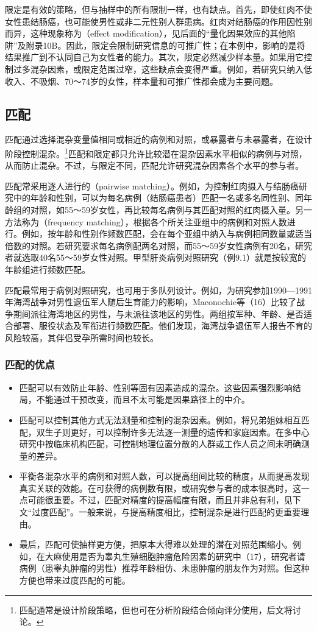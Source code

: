 限定是有效的策略，但与抽样中的所有限制一样，也有缺点。首先，即使红肉不使女性患结肠癌，也可能使男性或非二元性别人群患病。红肉对结肠癌的作用因性别而异，这种现象称为（effect modification），见后面的“量化因果效应的其他陷阱”及附录10B。因此，限定会限制研究信息的可推广性；在本例中，影响的是将结果推广到不认同自己为女性者的能力。其次，限定必然减少样本量。如果用它控制过多混杂因素，或限定范围过窄，这些缺点会变得严重。例如，若研究只纳入低收入、不吸烟、70～74岁的女性，样本量和可推广性都会成为主要问题。

\subsection{匹配}
匹配通过选择混杂变量值相同或相近的病例和对照，或暴露者与未暴露者，在设计阶段控制混杂。\footnote{匹配通常是设计阶段策略，但也可在分析阶段结合倾向评分使用，后文将讨论。}匹配和限定都只允许比较潜在混杂因素水平相似的病例与对照，从而防止混杂。不过，与限定不同，匹配允许研究混杂因素各个水平的参与者。

匹配常采用逐人进行的（pairwise matching）。例如，为控制红肉摄入与结肠癌研究中的年龄和性别，可以为每名病例（结肠癌患者）匹配一名或多名同性别、同年龄组的对照，如55～59岁女性，再比较每名病例与其匹配对照的红肉摄入量。另一方法称为（frequency matching），根据各个所关注亚组中的病例和对照人数进行。例如，按年龄和性别作频数匹配，会在每个亚组中纳入与病例相同数量或适当倍数的对照。若研究要求每名病例配两名对照，而55～59岁女性病例有20名，研究者就选取40名55～59岁女性对照。甲型肝炎病例对照研究（例9.1）就是按较宽的年龄组进行频数匹配。

匹配最常用于病例对照研究，也可用于多队列设计。例如，为研究参加1990—1991年海湾战争对男性退伍军人随后生育能力的影响，Maconochie等（16）比较了战争期间派往海湾地区的男性，与未派往该地区的男性。两组按军种、年龄、是否适合部署、服役状态及军衔进行频数匹配。他们发现，海湾战争退伍军人报告不育的风险较高，其伴侣受孕所需时间也较长。

\subsubsection{匹配的优点}
\begin{itemize}
\item 匹配可以有效防止年龄、性别等固有因素造成的混杂。这些因素强烈影响结局，不能通过干预改变，而且不太可能是因果路径上的中介。
\item 匹配可以控制其他方式无法测量和控制的混杂因素。例如，将兄弟姐妹相互匹配，双生子则更好，可以控制许多无法逐一测量的遗传和家庭因素。在多中心研究中按临床机构匹配，可控制地理位置分散的人群或工作人员之间未明确测量的差异。
\item 平衡各混杂水平的病例和对照人数，可以提高组间比较的精度，从而提高发现真实关联的效能。在可获得的病例数有限，或研究参与者的成本很高时，这一点可能很重要。不过，匹配对精度的提高幅度有限，而且并非总有利，见下文“过度匹配”。一般来说，与提高精度相比，控制混杂是进行匹配的更重要理由。
\item 最后，匹配可使抽样更方便，把原本大得难以处理的潜在对照范围缩小。例如，在大麻使用是否为睾丸生殖细胞肿瘤危险因素的研究中（17），研究者请病例（患睾丸肿瘤的男性）推荐年龄相仿、未患肿瘤的朋友作为对照。但这种方便也带来过度匹配的可能。
\end{itemize}

